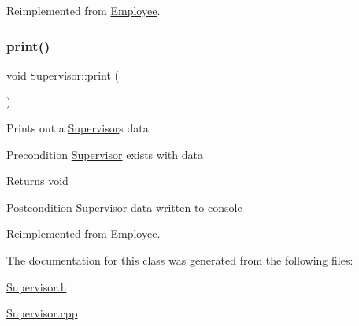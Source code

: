 Reimplemented from \hyperlink{classEmployee_a01c2c44e15434237db28832f6972e960}{Employee}.

\mbox{\label{classSupervisor_a92483dc9a54904d79b46c6ec4efb3f54}} 
\subsubsection{\texorpdfstring{print()}{print()}}
{\footnotesize\ttfamily void Supervisor\+::print (\begin{DoxyParamCaption}{ }\end{DoxyParamCaption})\hspace{0.3cm}{\ttfamily [virtual]}}

Prints out a \hyperlink{classSupervisor}{Supervisor}\textquotesingle{}s data

\begin{DoxyPrecond}{Precondition}
\hyperlink{classSupervisor}{Supervisor} exists with data 
\end{DoxyPrecond}
\begin{DoxyReturn}{Returns}
void 
\end{DoxyReturn}
\begin{DoxyPostcond}{Postcondition}
\hyperlink{classSupervisor}{Supervisor} data written to console 
\end{DoxyPostcond}


Reimplemented from \hyperlink{classEmployee_a79556ad700627dba88049f487a34a762}{Employee}.



The documentation for this class was generated from the following files\+:\begin{DoxyCompactItemize}
\item 
\hyperlink{Supervisor_8h}{Supervisor.\+h}\item 
\hyperlink{Supervisor_8cpp}{Supervisor.\+cpp}\end{DoxyCompactItemize}
